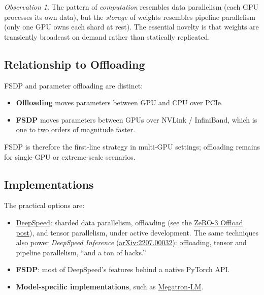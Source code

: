 \documentclass[11pt,a4paper]{article}
\theoremstyle{definition}
\theoremstyle{remark}
\newtheorem*{observation}{Observation}
\theoremstyle{plain}
\begin{document}
\begin{observation}
The pattern of \emph{computation} resembles data parallelism (each GPU
processes its own data), but the \emph{storage} of weights resembles
pipeline parallelism (only one GPU owns each shard at rest). The
essential novelty is that weights are transiently broadcast on demand
rather than statically replicated.
\end{observation}

\subsection{Relationship to Offloading}

FSDP and parameter offloading are distinct:
\begin{itemize}[leftmargin=1.5em, itemsep=2pt]
    \item \textbf{Offloading} moves parameters between GPU and CPU over
    PCIe.
    \item \textbf{FSDP} moves parameters between GPUs over NVLink /
    InfiniBand, which is one to two orders of magnitude faster.
\end{itemize}
FSDP is therefore the first-line strategy in multi-GPU settings;
offloading remains for single-GPU or extreme-scale scenarios.

\subsection{Implementations}

The practical options are:
\begin{itemize}[leftmargin=1.5em, itemsep=2pt]
    \item \href{https://www.deepspeed.ai/}{DeepSpeed}: sharded data
          parallelism, offloading (see the
          \href{https://www.deepspeed.ai/news/2021/03/07/zero3-offload.html}{ZeRO-3
          Offload post}), and tensor parallelism, under active
          development. The same techniques also power
          \emph{DeepSpeed Inference}
          (\href{https://arxiv.org/abs/2207.00032}{arXiv:2207.00032}):
          offloading, tensor and pipeline parallelism, ``and a ton of
          hacks.''
    \item \textbf{FSDP}: most of DeepSpeed's features behind a native
          PyTorch API.
    \item \textbf{Model-specific implementations}, such as
          \href{https://github.com/NVIDIA/Megatron-LM}{Megatron-LM}.
\end{itemize}
\end{document}
